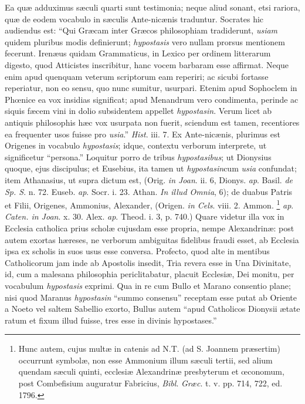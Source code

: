 Ea quæ
adduximus sæculi quarti sunt testimonia; neque aliud sonant, etsi
rariora, quæ de eodem vocabulo in sæculis Ante-nicænis traduntur.
Socrates hic audiendus est: ``Qui Græcam inter Græcos philosophiam
tradiderunt, \emph{usiam} quidem pluribus modis definierunt; \emph{hypostasis}
vero nullam prorsus mentionem fecerunt. Irenæus quidam Grammaticus,
in Lexico per ordinem litterarum digesto, quod Atticistes inscribitur,
hanc vocem barbaram esse affirmat. Neque enim apud quenquam veterum
scriptorum eam reperiri; ac sicubi fortasse reperiatur, non eo sensu,
quo nunc sumitur, usurpari. Etenim apud Sophoclem in Phœnice ea vox
insidias significat; apud Menandrum vero condimenta, perinde ac
siquis fæcem vini in dolio subsidentem appellet \emph{hypostasin}.
Verum licet ab antiquis philosophis hæc vox usurpata non fuerit,
sciendum est tamen, recentiores ea frequenter usos fuisse pro \emph{usia}.''
\emph{Hist}. iii. 7. Ex Ante-nicænis, plurimus est Origenes in
vocabulo \emph{hypostasis}; idque, contextu verborum interprete, ut
significetur ``persona.'' Loquitur porro de tribus \emph{hypostasibus};
ut Dionysius quoque, ejus discipulus; et Eusebius, ita tamen ut \emph{hypostasin}cum \emph{usia} confundat; item Athanasius, ut supra dictum est,
(Orig. \emph{in Joan}. ii. 6, Dionys. \emph{ap}. Basil. \emph{de Sp. S}.
n. 72. Euseb. \emph{ap}. Socr. i. 23. Athan. \emph{In illud Omnia},
6); de duabus Patris et Filii, Origenes, Ammonius, Alexander, (Origen.
\emph{in Cels}. viii. 2. Ammon. \footnote{Hunc autem,
cujus multæ in catenis ad N.T. (ad S. Joannem præsertim) occurrunt
symbolæ, non esse Ammonium illum sæculi tertii, sed alium quendam sæculi
quinti, ecclesiæ Alexandrinæ presbyterum et œconomum, post
Combefisium auguratur Fabricius, \emph{Bibl}. \emph{Græc}. t. v. pp.
714, 722, ed. 1796.}
\emph{ap}. \emph{Caten. in Joan}. x. 30. Alex. \emph{ap}. Theod. i. 3,
p. 740.) Quare videtur illa vox in Ecclesia catholica prius scholæ
cujusdam esse propria, nempe Alexandrinæ: post autem exortas hæreses,
ne verborum ambiguitas fidelibus fraudi esset, ab Ecclesia ipsa ex
scholis in suos usus esse conversa. Profecto, quod alte in mentibus
Catholicorum jam inde ab Apostolis insedit, Tria revera esse in Una
Divinitate, id, cum a malesana philosophia periclitabatur, placuit
Ecclesiæ, Dei monitu, per vocabulum \emph{hypostasis} exprimi. Qua in
re cum Bullo et Marano consentio plane; nisi quod Maranus \emph{hypostasin}
``summo consensu'' receptam esse putat ab Oriente a Noeto vel
saltem Sabellio exorto, Bullus autem ``apud Catholicos Dionysii ætate
ratum et fixum illud fuisse, tres esse in divinis hypostases.''

